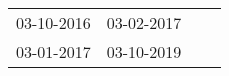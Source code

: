 \begin{supertabular}{llll}
 03-10-2016 &  03-02-2017 \\
 03-01-2017 &  03-10-2019 \\
\end{supertabular}
